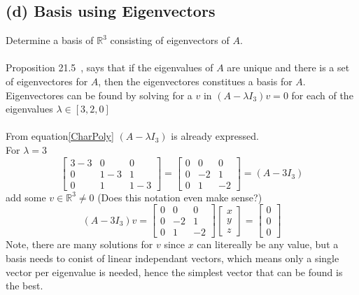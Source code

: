 \documentclass[12pt]{article}
\begin{document}
\subsection*{(d) Basis using Eigenvectors}
Determine a basis of $\mathbb{R}^3$ consisting of eigenvectors of $A$.\\\\
Proposition 21.5~\cite{NUMLA}, says that if the eigenvalues of $A$ are unique and there is a set of eigenvectores for $A$, then the eigenvectores constitues a basis for $A$.\\
Eigenvectores can be found by solving for a $v$ in $(A - \lambda I_3)v = 0$ for each of the eigenvalues $\lambda \in [3,2,0]$\\\\
From equation\eqref{CharPoly} $(A - \lambda I_3)$ is already expressed.\\
For $\lambda = 3$
\begin{equation*}
    \begin{bmatrix}
        3 - 3 & 0 & 0 \\
        0 & 1 - 3 & 1 \\
        0 & 1 & 1 - 3
    \end{bmatrix} 
    =
     \begin{bmatrix}
        0 & 0 & 0 \\
        0 &  - 2 & 1 \\
        0 & 1 &  - 2
    \end{bmatrix} 
    = (A - 3 I_3)
\end{equation*}
add some $v \in \mathbb{R}^3 \neq 0$ (Does this notation even make sense?)
\begin{equation*}
    (A - 3 I_3)v =
 \begin{bmatrix}
        0 & 0 & 0 \\
        0 &  - 2 & 1 \\
        0 & 1 &  - 2
    \end{bmatrix} 
     \begin{bmatrix}
        x \\
        y \\
        z
    \end{bmatrix}
    =
    \begin{bmatrix}
        0 \\
        0 \\
        0
    \end{bmatrix} 
\end{equation*}
Note, there are many solutions for $v$ since $x$ can litereally be any value, but a basis needs to conist of linear independant vectors, which means only a single vector per eigenvalue is needed, hence the simplest vector that can be found is the best.\\
\end{document}
